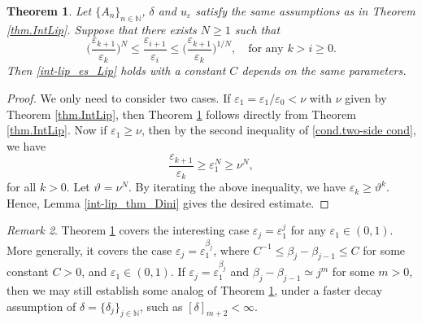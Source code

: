 \documentclass[reqno,12pt]{amsart} %
\newtheorem{theorem}{Theorem}[section]
\theoremstyle{definition}
\theoremstyle{remark}
\newtheorem{remark}[theorem]{Remark}
\numberwithin{equation}{section}
\newcommand{\N}{\mathbb{N}}
\newcommand{\e}{\varepsilon}
\begin{document}
\begin{theorem}\label{thm.typicalLipEst}
    Let $\{ A_n\}_{n\in \N}$, $\delta$ and $u_\e$ satisfy the same assumptions as in Theorem \ref{thm.IntLip}. Suppose that there exists $N \ge 1$ such that
    \begin{equation}\label{cond.two-side cond}
        \bigg(\frac{\varepsilon_{k+1}}{\varepsilon_{k}}\bigg)^N\leq \frac{\varepsilon_{i+1}}{\varepsilon_{i}} \le \bigg(\frac{\varepsilon_{k+1}}{\varepsilon_{k}}\bigg)^{1/N}, \quad \text{for any } k > i \ge 0.
    \end{equation}
    Then \eqref{int-lip_es_Lip} holds with a constant $C$ depends on the same parameters.
\end{theorem}
\begin{proof}
    We only need to consider two cases. If $\e_1 = \e_1/\e_0 < \nu$ with $\nu$ given by Theorem \ref{thm.IntLip}, then Theorem \ref{thm.typicalLipEst} follows directly from Theorem \ref{thm.IntLip}. Now if $\e_1 \ge \nu$, then by the second inequality of \eqref{cond.two-side cond}, we have
    \begin{equation*}
        \frac{\e_{k+1}}{\e_k} \ge \e_1^N \ge \nu^N,
    \end{equation*}
    for all $k > 0$.
    Let $\vartheta = \nu^N$. By iterating the above inequality, we have
    $
        \e_k \ge \vartheta^k.
    $
    Hence, Lemma \ref{int-lip_thm_Dini} gives the desired estimate.
\end{proof}

\begin{remark}\label{rmk.typical}
    Theorem \ref{thm.typicalLipEst} covers the interesting case $\e_j  = \e_1^j$ for any $\e_1 \in (0,1)$. More generally, it covers the case $\e_j = \e_1^{\beta_j}$, where  $C^{-1} \le \beta_j - \beta_{j-1} \le C$ for some constant $C>0$, and  $\e_1 \in (0,1)$. If $\e_j = \e_1^{\beta_j}$ and $\beta_j - \beta_{j-1} \simeq j^m$ for some $m>0$, then we may still establish some analog of Theorem \ref{thm.typicalLipEst}, under a faster decay assumption of $\delta = \{\delta_j\}_{j\in \N}$, such as $[\delta]_{m+2} < \infty$.
\end{remark}




\end{document}
